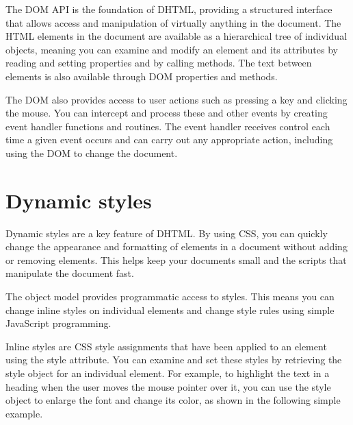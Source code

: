 The DOM API is the foundation of DHTML, providing a structured interface that allows access and manipulation of virtually anything in the document. The HTML elements in the document are available as a hierarchical tree of individual objects, meaning you can examine and modify an element and its attributes by reading and setting properties and by calling methods. The text between elements is also available through DOM properties and methods.


The DOM also provides access to user actions such as pressing a key and clicking the mouse. You can intercept and process these and other events by creating event handler functions and routines. The event handler receives control each time a given event occurs and can carry out any appropriate action, including using the DOM to change the document.




\chapter{Dynamic styles}

Dynamic styles are a key feature of DHTML. By using CSS, you can quickly change the appearance and formatting of elements in a document without adding or removing elements. This helps keep your documents small and the scripts that manipulate the document fast.


The object model provides programmatic access to styles. This means you can change inline styles on individual elements and change style rules using simple JavaScript programming.

Inline styles are CSS style assignments that have been applied to an element using the style attribute. You can examine and set these styles by retrieving the style object for an individual element. For example, to highlight the text in a heading when the user moves the mouse pointer over it, you can use the style object to enlarge the font and change its color, as shown in the following simple example.


